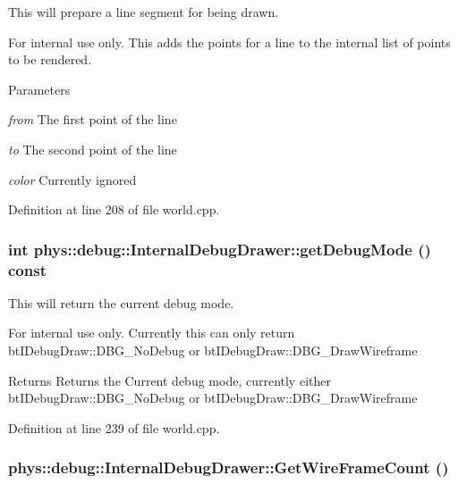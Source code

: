 This will prepare a line segment for being drawn. 

\begin{DoxyInternal}{For internal use only.}
This adds the points for a line to the internal list of points to be rendered. 
\begin{DoxyParams}{Parameters}
\item[{\em from}]The first point of the line \item[{\em to}]The second point of the line \item[{\em color}]Currently ignored \end{DoxyParams}
\end{DoxyInternal}


Definition at line 208 of file world.cpp.

\hypertarget{classphys_1_1debug_1_1InternalDebugDrawer_aba329861569d741e970ce5aafb668e84}{
\subsubsection[{getDebugMode}]{\setlength{\rightskip}{0pt plus 5cm}int phys::debug::InternalDebugDrawer::getDebugMode () const}}
\label{db/d27/classphys_1_1debug_1_1InternalDebugDrawer_aba329861569d741e970ce5aafb668e84}


This will return the current debug mode. 

\begin{DoxyInternal}{For internal use only.}
Currently this can only return btIDebugDraw::DBG\_\-NoDebug or btIDebugDraw::DBG\_\-DrawWireframe \begin{DoxyReturn}{Returns}
Returns the Current debug mode, currently either btIDebugDraw::DBG\_\-NoDebug or btIDebugDraw::DBG\_\-DrawWireframe 
\end{DoxyReturn}
\end{DoxyInternal}


Definition at line 239 of file world.cpp.

\hypertarget{classphys_1_1debug_1_1InternalDebugDrawer_aa1666e636e6ff81813c0b1a85d7bc157}{
\subsubsection[{GetWireFrameCount}]{ phys::debug::InternalDebugDrawer::GetWireFrameCount ()}}
\label{db/d27/classphys_1_1debug_1_1InternalDebugDrawer_aa1666e636e6ff81813c0b1a85d7bc157}


